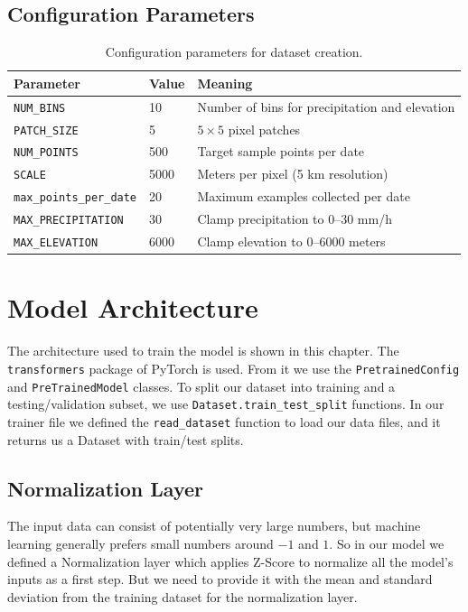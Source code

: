 \documentclass[12pt, a4paper]{report}
\begin{document}
\section{Configuration Parameters}

\begin{table}[H]
\centering
\begin{tabular}{@{}lll@{}}
\toprule
\textbf{Parameter} & \textbf{Value} & \textbf{Meaning} \\
\midrule
\texttt{NUM\_BINS} & 10 & Number of bins for precipitation and elevation \\
\texttt{PATCH\_SIZE} & 5 & $5 \times 5$ pixel patches \\
\texttt{NUM\_POINTS} & 500 & Target sample points per date \\
\texttt{SCALE} & 5000 & Meters per pixel (5 km resolution) \\
\texttt{max\_points\_per\_date} & 20 & Maximum examples collected per date \\
\texttt{MAX\_PRECIPITATION} & 30 & Clamp precipitation to 0--30 mm/h \\
\texttt{MAX\_ELEVATION} & 6000 & Clamp elevation to 0--6000 meters \\
\bottomrule
\end{tabular}
\caption{Configuration parameters for dataset creation.}
\label{tab:dataset_config}
\end{table}


\chapter{Model Architecture}

The architecture used to train the model is shown in this chapter. The \texttt{transformers} package of PyTorch is used. From it we use the \texttt{PretrainedConfig} and \texttt{PreTrainedModel} classes. To split our dataset into training and a testing/validation subset, we use \texttt{Dataset.train\_test\_split} functions. In our trainer file we defined the \texttt{read\_dataset} function to load our data files, and it returns us a Dataset with train/test splits.

\section{Normalization Layer}

The input data can consist of potentially very large numbers, but machine learning generally prefers small numbers around $-1$ and $1$. So in our model we defined a Normalization layer which applies Z-Score to normalize all the model's inputs as a first step. But we need to provide it with the mean and standard deviation from the training dataset for the normalization layer.
\end{document}
